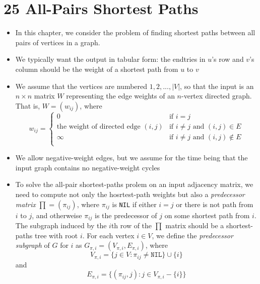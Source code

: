 \documentclass{report}
\begin{document}
\section*{25 All-Pairs Shortest Paths}
\begin{itemize}
    \item In this chapter, we consider the problem of finding shortest paths between all pairs of vertices in a graph.
    \item We typically want the output in tabular form: the endtries in $u$'s row and $v$'s column should be the weight of a shortest path from $u$ to $v$
    \item We assume that the vertices are numbered $1, 2, ..., |V|$, so that the input is an $n \times n$ matrix $W$ representing the edge weights of an $n$-vertex directed graph. That is, $W = (w_{ij})$, where
    \[
    w_{ij} = 
    \begin{cases}
        0 & \text{if $i = j$} \\
        \text{the weight of directed edge $(i, j)$} & \text{if $i \neq j$ and $(i, j) \in E$} \\
        \infty & \text{if $i \neq j$ and $(i, j) \notin E$} \\
    \end{cases}    
    \]
    \item We allow negative-weight edges, but we assume for the time being that the input graph contains no negative-weight cycles
    \item To solve the all-pair shortest-paths prolem on an input adjacency matrix, we need to compute not only the hosrtest-path weights but also a \textit{predecessor matrix} $\prod = (\pi_{ij})$, where $\pi_{ij}$ is \texttt{NIL} if either $i = j$ or there is not path from $i$ to $j$, and otherweise $\pi_{ij}$ is the predecessor of $j$ on some shortest path from $i$. The subgraph induced by the $i$th row of the $\prod$ matrix should be a shortest-paths tree with root $i$. For each vertex $i \in V$, we define the \textit{predecessor subgraph} of $G$ for $i$ as $G_{\pi, i} = (V_{\pi, i}, E_{\pi, i})$, where
    $$V_{\pi, i} = \{j \in V: \pi_{ij} \neq \texttt{NIL}\} \cup \{i\}$$
    and
    $$E_{\pi, i} = \{(\pi_{ij}, j): j \in V_{\pi, i} - \{i\}\}$$
\end{itemize}
\end{document}
